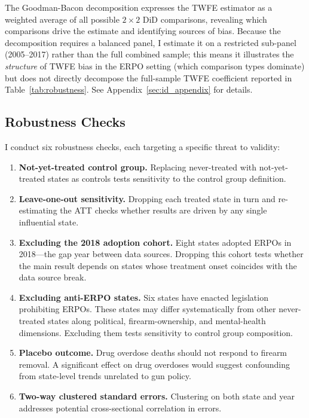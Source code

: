 \documentclass[12pt]{article}
\begin{document}
The Goodman-Bacon decomposition \citep{goodmanbacon2021difference} expresses the TWFE estimator as a weighted average of all possible $2 \times 2$ DiD comparisons, revealing which comparisons drive the estimate and identifying sources of bias. Because the decomposition requires a balanced panel, I estimate it on a restricted sub-panel (2005--2017) rather than the full combined sample; this means it illustrates the \textit{structure} of TWFE bias in the ERPO setting (which comparison types dominate) but does not directly decompose the full-sample TWFE coefficient reported in Table~\ref{tab:robustness}. See Appendix~\ref{sec:id_appendix} for details.

\subsection{Robustness Checks}

I conduct six robustness checks, each targeting a specific threat to validity:

\begin{enumerate}
\item \textbf{Not-yet-treated control group.} Replacing never-treated with not-yet-treated states as controls tests sensitivity to the control group definition.
\item \textbf{Leave-one-out sensitivity.} Dropping each treated state in turn and re-estimating the ATT checks whether results are driven by any single influential state.
\item \textbf{Excluding the 2018 adoption cohort.} Eight states adopted ERPOs in 2018---the gap year between data sources. Dropping this cohort tests whether the main result depends on states whose treatment onset coincides with the data source break.
\item \textbf{Excluding anti-ERPO states.} Six states have enacted legislation prohibiting ERPOs. These states may differ systematically from other never-treated states along political, firearm-ownership, and mental-health dimensions. Excluding them tests sensitivity to control group composition.
\item \textbf{Placebo outcome.} Drug overdose deaths should not respond to firearm removal. A significant effect on drug overdoses would suggest confounding from state-level trends unrelated to gun policy.
\item \textbf{Two-way clustered standard errors.} Clustering on both state and year addresses potential cross-sectional correlation in errors.
\end{enumerate}
\end{document}
